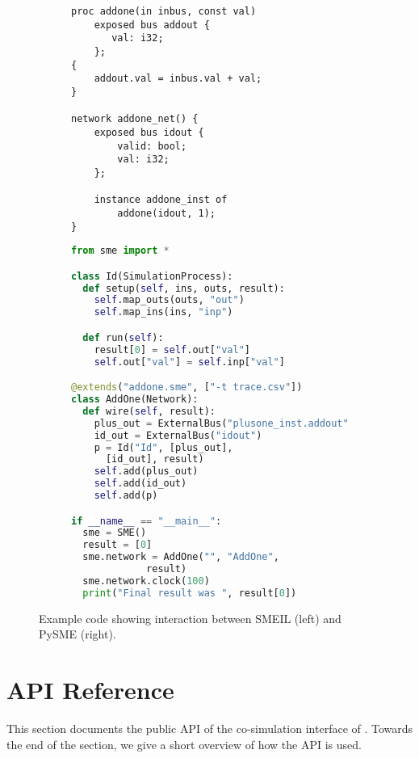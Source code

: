 \begin{figure}
  \centerfloat
  \begin{subfigure}[t]{0.40\paperwidth}
\begin{lstlisting}[language=smeil]
proc addone(in inbus, const val)
    exposed bus addout {
       val: i32;
    };
{
    addout.val = inbus.val + val;
}

network addone_net() {
    exposed bus idout {
        valid: bool;
        val: i32;
    };

    instance addone_inst of
        addone(idout, 1);
}
\end{lstlisting}
    
  \end{subfigure}
  \begin{subfigure}[t]{0.40\paperwidth}
    \begin{lstlisting}[language=python]
from sme import *

class Id(SimulationProcess):
  def setup(self, ins, outs, result):
    self.map_outs(outs, "out")
    self.map_ins(ins, "inp")

  def run(self):
    result[0] = self.out["val"]
    self.out["val"] = self.inp["val"]

@extends("addone.sme", ["-t trace.csv"])
class AddOne(Network):
  def wire(self, result):
    plus_out = ExternalBus("plusone_inst.addout")
    id_out = ExternalBus("idout")
    p = Id("Id", [plus_out],
      [id_out], result)
    self.add(plus_out)
    self.add(id_out)
    self.add(p)

if __name__ == "__main__":
  sme = SME()
  result = [0]
  sme.network = AddOne("", "AddOne",
             result)
  sme.network.clock(100)
  print("Final result was ", result[0])
  \end{lstlisting}
  \end{subfigure}

  \caption{Example code showing interaction between SMEIL (left) and PySME
    (right).}
\label{fig:smeilpy}
\end{figure}

\section{API Reference}
This section documents the public API of the co-simulation interface of
\libsme{}. Towards the end of the section, we give a short overview of how the
API is used.

